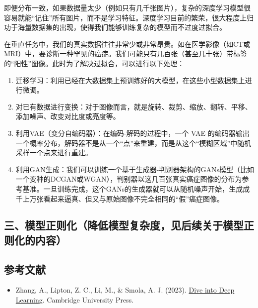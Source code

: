 即便分布一致，如果数据量太少（例如只有几千张图片），复杂的深度学习模型很容易就能``记住''所有图片，而不是学习特征。深度学习目前的繁荣，很大程度上归功于海量数据集的出现，使得我们能够训练复杂的模型而不过度过拟合。

在垂直任务中，我们的真实数据往往非常少或非常昂贵。如在医学影像（如CT或MRI）中，要诊断一种罕见的癌症。我们可能只有几百张（甚至几十张）带标签的``阳性''图像。此时为了解决过拟合，可以进行以下处理：

\begin{enumerate}
\def\labelenumi{\arabic{enumi}.}
\item
  迁移学习：利用已经在大数据集上预训练好的大模型，在这些小型数据集上进行微调。
\item
  对已有数据进行变换：对于图像而言，就是旋转、裁剪、缩放、翻转、平移、添加噪声、改变对比度或亮度等。
\item
  利用VAE（变分自编码器）：在编码-解码的过程中，一个 VAE 的编码器输出一个概率分布，解码器不是从一个``点''来重建，而是从这个``模糊区域''中随机采样一个点来进行重建。
\item
  利用GAN生成：我们可以训练一个基于生成器-判别器架构的GANs模型（比如一个变种的DCGAN或WGAN），判别器以这几百张真实癌症图像的分布为参考基准。一旦训练完成，这个GANs的生成器就可以从随机噪声开始，生成成千上万张看起来逼真、但又与原始图像不完全相同的``假''癌症图像。
\end{enumerate}

\hypertarget{ux4e09ux6a21ux578bux6b63ux5219ux5316ux964dux4f4eux6a21ux578bux590dux6742ux5ea6ux89c1ux540eux7eedux5173ux4e8eux6a21ux578bux6b63ux5219ux5316ux7684ux5185ux5bb9}{%
\subsection{三、模型正则化（降低模型复杂度，见后续关于模型正则化的内容）}\label{ux4e09ux6a21ux578bux6b63ux5219ux5316ux964dux4f4eux6a21ux578bux590dux6742ux5ea6ux89c1ux540eux7eedux5173ux4e8eux6a21ux578bux6b63ux5219ux5316ux7684ux5185ux5bb9}}

\FloatBarrier
{}
\hypertarget{ux53c2ux8003ux6587ux732e-3}{%
\subsection{参考文献}\label{ux53c2ux8003ux6587ux732e-3}}

\vspace{0.25em}
\begin{itemize}
\tightlist
\item
  Zhang, A., Lipton, Z. C., Li, M., \& Smola, A. J. (2023). \href{https://D2L.ai}{Dive into Deep Learning}. Cambridge University Press.
\end{itemize}

\clearpage
